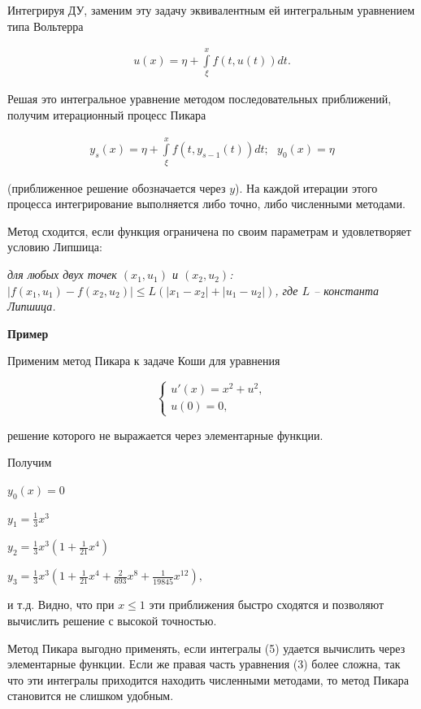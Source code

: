 \documentclass[a4paper,14pt]{article}
\begin{document}
Интегрируя ДУ, заменим эту задачу эквивалентным ей интегральным уравнением типа
Вольтерра

\begin{eqnarray}
	u(x) = \eta + \int\limits_{\xi}^x f(t, u(t)) d t.
\end{eqnarray}

Решая это интегральное уравнение методом последовательных приближений,
получим итерационный процесс Пикара

\begin{eqnarray}
	y_s(x) = \eta + \int\limits_{\xi}^x f(t, y_{s-1}(t)) dt; \, \, \, \, y_0(x) = \eta
\end{eqnarray}
 
(приближенное решение обозначается через $y$). На каждой итерации этого процесса
интегрирование выполняется либо точно, либо численными методами.

Метод сходится, если функция
ограничена по своим параметрам и удовлетворяет условию Липшица:

\textit{для любых двух точек $(x_1, u_1)$ и $(x_2, u_2)$:
	$\left| f(x_1, u_1) - f(x_2, u_2) \right| \leq L(|x_1 - x_2| + |u_1 - u_2|)$, 
	где $L$ -- константа Липшица.}

\textbf{Пример}

Применим метод Пикара к задаче Коши для уравнения

\begin{equation}
	\begin{cases}
		u'(x) = x^2 + u^2, \\
		u(0) = 0,
	\end{cases}
\end{equation}

решение которого не выражается через элементарные функции.

Получим

$y_0(x) = 0$

$y_1 = \frac{1}{3} x^3$

$y_2 = \frac{1}{3} x^3 \left( 1 + \frac{1}{21} x^4 \right)$

$y_3 = \frac{1}{3} x^3 \left( 1 + \frac{1}{21} x^4 + \frac{2}{693} x^8 + \frac{1}{19845} x^12 \right),$

и т.д. Видно, что при $x \leq 1$ эти приближения быстро сходятся и позволяют
вычислить решение с высокой точностью.

Метод Пикара выгодно применять, если интегралы (5) удается вычислить
через элементарные функции. Если же правая часть уравнения (3)
более сложна, так что эти интегралы приходится находить численными методами,
то метод Пикара становится не слишком удобным.
\end{document}
